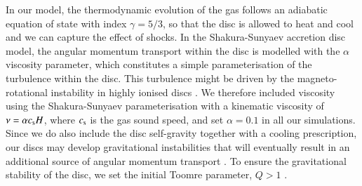 \documentclass{aa}
\begin{document}
In our model, the thermodynamic evolution of the gas follows an adiabatic equation of state with index $\gamma = 5/3$, so that the disc is allowed to heat and cool and we can capture the effect of shocks. 
In the Shakura-Sunyaev accretion disc model, the angular momentum transport within the disc is modelled with the $\alpha$ viscosity parameter, which constitutes a simple parameterisation of the turbulence within the disc. This turbulence might be driven by the magneto-rotational instability in highly ionised discs \citep{balbushawley1991}. We therefore included viscosity using the Shakura-Sunyaev parameterisation with a kinematic viscosity of $\nu = \alpha c_{\rm s } H$, where $c_{\rm s}$ is the gas sound speed, and set $\alpha=0.1$ in all our simulations.
Since we do also include the disc self-gravity together with a cooling prescription, our discs may develop gravitational instabilities that will eventually result in an additional source of angular momentum transport \citep{lodatorice2004,Lodatorice2005,lodato2007sg}.
To ensure the gravitational stability of the disc, we set the initial Toomre parameter, $Q > 1$ \citep{Toomre1964}. 
\end{document}
